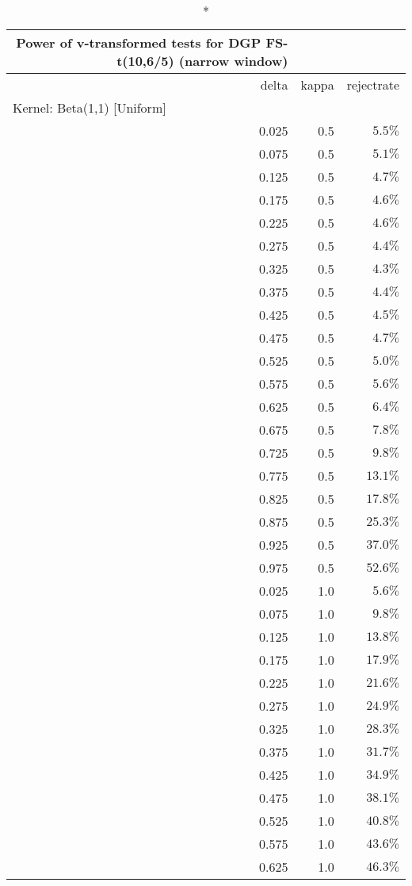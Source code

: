 \setlength{\LTpost}{0mm}
\begin{longtable}{rrr}
\caption*{
{\large Power of v-transformed tests for DGP FS-t(10,6/5) (narrow window)}
} \\ 
\toprule
delta & kappa & rejectrate \\ 
\midrule
\multicolumn{3}{l}{Kernel: Beta(1,1) [Uniform]} \\ 
\midrule
0.025 & 0.5 & $5.5\%$ \\ 
0.075 & 0.5 & $5.1\%$ \\ 
0.125 & 0.5 & $4.7\%$ \\ 
0.175 & 0.5 & $4.6\%$ \\ 
0.225 & 0.5 & $4.6\%$ \\ 
0.275 & 0.5 & $4.4\%$ \\ 
0.325 & 0.5 & $4.3\%$ \\ 
0.375 & 0.5 & $4.4\%$ \\ 
0.425 & 0.5 & $4.5\%$ \\ 
0.475 & 0.5 & $4.7\%$ \\ 
0.525 & 0.5 & $5.0\%$ \\ 
0.575 & 0.5 & $5.6\%$ \\ 
0.625 & 0.5 & $6.4\%$ \\ 
0.675 & 0.5 & $7.8\%$ \\ 
0.725 & 0.5 & $9.8\%$ \\ 
0.775 & 0.5 & $13.1\%$ \\ 
0.825 & 0.5 & $17.8\%$ \\ 
0.875 & 0.5 & $25.3\%$ \\ 
0.925 & 0.5 & $37.0\%$ \\ 
0.975 & 0.5 & $52.6\%$ \\ 
0.025 & 1.0 & $5.6\%$ \\ 
0.075 & 1.0 & $9.8\%$ \\ 
0.125 & 1.0 & $13.8\%$ \\ 
0.175 & 1.0 & $17.9\%$ \\ 
0.225 & 1.0 & $21.6\%$ \\ 
0.275 & 1.0 & $24.9\%$ \\ 
0.325 & 1.0 & $28.3\%$ \\ 
0.375 & 1.0 & $31.7\%$ \\ 
0.425 & 1.0 & $34.9\%$ \\ 
0.475 & 1.0 & $38.1\%$ \\ 
0.525 & 1.0 & $40.8\%$ \\ 
0.575 & 1.0 & $43.6\%$ \\ 
0.625 & 1.0 & $46.3\%$ \\ 

\end{longtable}
